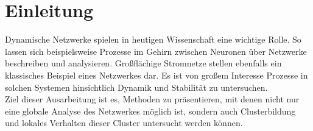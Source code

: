\section{Einleitung}\label{einleitung}
Dynamische Netzwerke spielen in heutigen Wissenschaft eine wichtige Rolle. So lassen sich beispielsweise Prozesse im Gehirn zwischen Neuronen über Netzwerke beschreiben und analysieren. Großflächige Stromnetze stellen ebenfalls ein klassisches Beispiel eines Netzwerkes dar. Es ist von großem Interesse Prozesse in solchen Systemen hinsichtlich Dynamik und Stabilität zu untersuchen.\\
Ziel dieser Ausarbeitung ist es, Methoden zu präsentieren, mit denen nicht nur eine globale Analyse des Netzwerkes möglich ist, sondern auch Clusterbildung und lokales Verhalten dieser Cluster untersucht werden können.